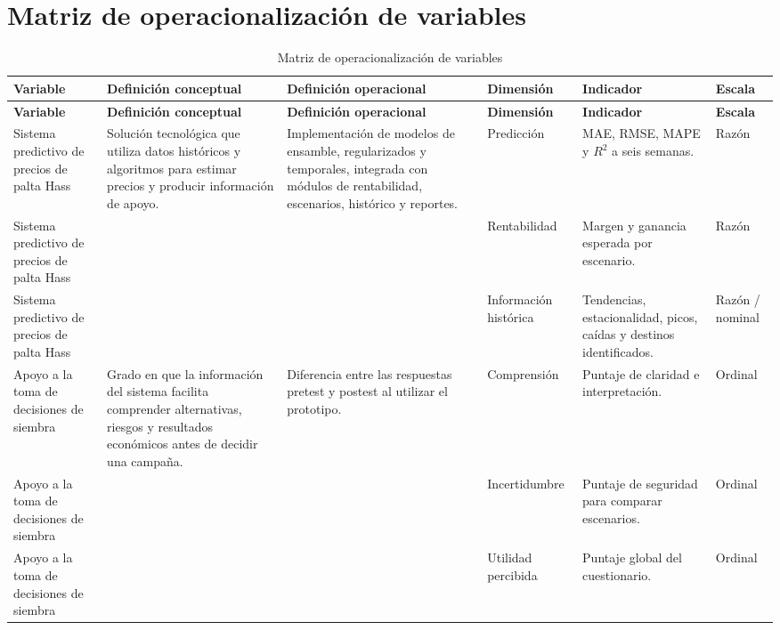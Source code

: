 \chapter{Matriz de operacionalización de variables}

\begingroup
\scriptsize
\setlength{\tabcolsep}{3pt}
\begin{longtable}{p{2.1cm}p{3cm}p{3cm}p{2cm}p{2.4cm}p{1.4cm}}
\caption{Matriz de operacionalización de variables}\\
\toprule
\textbf{Variable} & \textbf{Definición conceptual} & \textbf{Definición operacional} & \textbf{Dimensión} & \textbf{Indicador} & \textbf{Escala} \\
\midrule
\endfirsthead
\toprule
\textbf{Variable} & \textbf{Definición conceptual} & \textbf{Definición operacional} & \textbf{Dimensión} & \textbf{Indicador} & \textbf{Escala} \\
\midrule
\endhead
Sistema predictivo de precios de palta Hass & Solución tecnológica que utiliza datos históricos y algoritmos para estimar precios y producir información de apoyo. & Implementación de modelos de ensamble, regularizados y temporales, integrada con módulos de rentabilidad, escenarios, histórico y reportes. & Predicción & MAE, RMSE, MAPE y $R^2$ a seis semanas. & Razón \\
\midrule
Sistema predictivo de precios de palta Hass &  &  & Rentabilidad & Margen y ganancia esperada por escenario. & Razón \\
\midrule
Sistema predictivo de precios de palta Hass &  &  & Información histórica & Tendencias, estacionalidad, picos, caídas y destinos identificados. & Razón / nominal \\
\midrule
Apoyo a la toma de decisiones de siembra & Grado en que la información del sistema facilita comprender alternativas, riesgos y resultados económicos antes de decidir una campaña. & Diferencia entre las respuestas pretest y postest al utilizar el prototipo. & Comprensión & Puntaje de claridad e interpretación. & Ordinal \\
\midrule
Apoyo a la toma de decisiones de siembra &  &  & Incertidumbre & Puntaje de seguridad para comparar escenarios. & Ordinal \\
\midrule
Apoyo a la toma de decisiones de siembra &  &  & Utilidad percibida & Puntaje global del cuestionario. & Ordinal \\
\bottomrule
\end{longtable}
\endgroup
